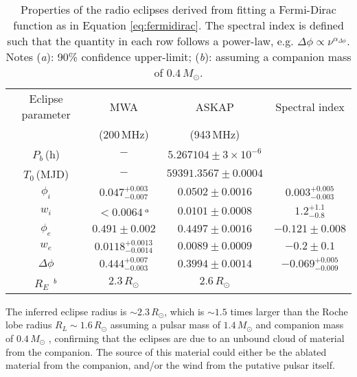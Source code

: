 \documentclass[fleqn,usenatbib]{mnras}
\newcommand{\todo}[1]{\textcolor{red}{TODO: #1}\PackageWarning{TODO:}{#1!}}
\newcommand{\periodh}{$5.267104\pm{3\times 10^{-6}}$}
\begin{document}
\begin{table*}
    \centering
    \begin{tabular}{cccc}
    \hline
    {Eclipse parameter}  & {MWA} & {ASKAP} & {Spectral index} \\
    {}        & {(200\,MHz)}                      & {(943\,MHz)}      & {}\\
    \hline
    \hline
    $P_b$\,(h)           & $-$                       & \periodh{} & \\
    $T_0$\,(MJD)         & $-$                       & $59391.3567\pm0.0004$ & \\
    $\phi_i$             & $0.047^{+0.003}_{-0.007}$ & $0.0502\pm0.0016$ & $0.003^{+0.005}_{-0.003}$\\
    $w_i$                & $< 0.0064$\,$^\text{\textit{a}}$  & $0.0101\pm0.0008$                   & $1.2^{+1.1}_{-0.8}$ \\
    $\phi_e$             & $0.491\pm 0.002$          & $0.4497\pm0.0016$           & $-0.121\pm0.008$ \\
    $w_e$                & $0.0118^{+0.0013}_{-0.0014}$ & $0.0089\pm0.0009$           & $-0.2\pm0.1$\\
    $\Delta \phi$        & $0.444^{+0.007}_{-0.003}$ & $0.3994\pm0.0014$   & $-0.069^{+0.005}_{-0.009}$\\
    $R_E$ $^\text{\textit{b}}$ & $2.3\,R_\odot$             & $2.6\,R_\odot$ & \\
    \hline
    \end{tabular}
    \caption{Properties of the radio eclipses derived from fitting a Fermi-Dirac function as in Equation \ref{eq:fermidirac}. The spectral index is defined such that the quantity in each row follows a power-law, e.g. $\Delta \phi \propto \nu^{\alpha_{\Delta \phi}}$. Notes (\textit{a}): 90\% confidence upper-limit; (\textit{b}): {assuming a companion mass of $0.4\,M_\odot$}.\label{tab:eclipse_table}}
\end{table*}

The inferred eclipse radius is $\sim2.3\,R_\odot$, which is $\sim1.5$ times larger than the Roche lobe radius $R_L\sim 1.6\,R_\odot$ assuming a pulsar mass of $1.4\,M_\odot$ and companion mass of $0.4\,M_\odot$ \citep[computed using the approximation of][]{1983ApJ...268..368E}, confirming that the eclipses are due to an unbound cloud of material from the companion. The source of this material could either be the ablated material from the companion, and/or the wind from the putative pulsar itself.
\end{document}
